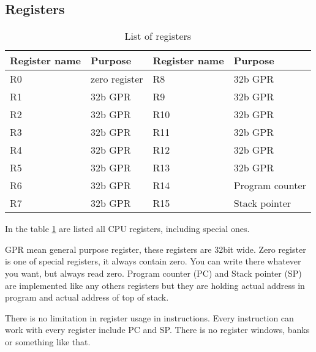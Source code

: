 \subsection{Registers}

\begin{table}[h]
    \centering
    \begin{tabular}{|l|l|l|l|}
        \hline
        \textbf{Register name} & \textbf{Purpose} & \textbf{Register name} & \textbf{Purpose} \\ \hline
        R0                     & zero register    & R8                     & 32b GPR          \\ \hline
        R1                     & 32b GPR          & R9                     & 32b GPR          \\ \hline
        R2                     & 32b GPR          & R10                    & 32b GPR          \\ \hline
        R3                     & 32b GPR          & R11                    & 32b GPR          \\ \hline
        R4                     & 32b GPR          & R12                    & 32b GPR          \\ \hline
        R5                     & 32b GPR          & R13                    & 32b GPR          \\ \hline
        R6                     & 32b GPR          & R14                    & Program counter  \\ \hline
        R7                     & 32b GPR          & R15                    & Stack pointer    \\ \hline
    \end{tabular}
    \caption{List of registers}
    \label{tab:registers_list}
\end{table}

In the table \ref{tab:registers_list} are listed all CPU registers, including
special ones.

GPR mean general purpose register, these registers are 32bit wide.
Zero register is one of special registers, it always contain zero.
You can write there whatever you want, but always read zero. Program
counter (PC) and Stack pointer (SP) are implemented like any others
registers but they are holding actual address in program and actual
address of top of stack.

There is no limitation in register usage in instructions. Every
instruction can work with every register include PC and SP. There is
no register windows, banks or something like that.
